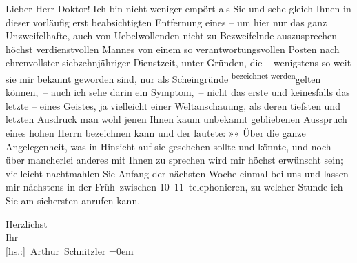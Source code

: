 \pstart{}Lieber Herr Doktor!\pend\vspace{0.5em}
\pstart
           Ich bin nicht weniger empört als Sie und sehe gleich Ihnen in dieser \introOben{}vorläufig erst\introOben{} beabsichtigten Entfernung eines – um hier nur
               das ganz Unzweifelhafte, auch von Uebelwollenden nicht zu Bezweifelnde auszusprechen
               – höchst verdienstvollen Mannes von einem so verantwortungsvollen Posten nach ehrenvollster
               siebzehnjähriger Dienstzeit\introOben{},\introOben{} unter Gründen, die \introOben{}–\introOben{} wenigstens so
               weit sie mir bekannt geworden sind, nur als Scheingründe \substVorne{}\textsuperscript{bezeichnet werden}\substDazwischen{}gelten\substHinten{} können, – auch ich sehe darin ein Symptom, – nicht das erste und keinesfalls
               das letzte – eines Geistes, ja vielleicht einer Weltanschauung, als deren tiefsten
               und letzten Ausdruck man wohl jenen Ihnen kaum unbekannt gebliebenen Ausspruch eines
               hohen Herrn bezeichnen kann
               und der lautete: »\label{K_L03768-1v}\label{K_L03768-1}« Über
               die ganze Angelegenheit, was in {\pb}Hinsicht auf sie
               geschehen sollte und könnte, und noch über mancherlei anderes mit Ihnen zu sprechen
               wird mir höchst erwünscht sein; vielleicht nachtmahlen Sie Anfang der nächsten Woche
               einmal bei uns und lassen mir nächstens in der Früh zwischen
               10–11 telephonieren, zu welcher
               Stunde ich Sie am sichersten anrufen kann.\pend
           
\pstart
           Herzlichst{\\[\baselineskip]}Ihr{\\[\baselineskip]}\spacefill\mbox{{[}hs.:{]} Arthur Schnitzler}\pend
           \leftskip=0em{}\endnumbering{}
\begin{anhang}
\end{anhang}
      